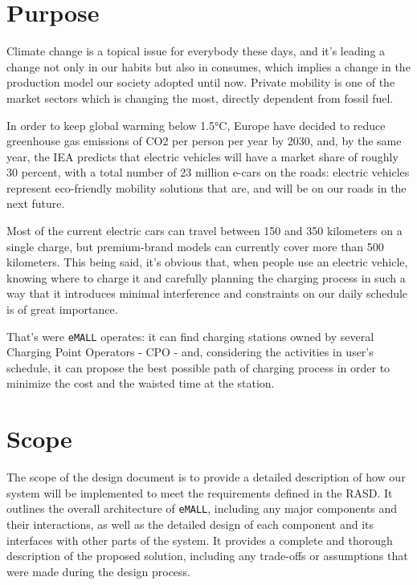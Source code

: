 \section{Purpose}
\label{sec:purpose}%
Climate change is a topical issue for everybody these days, and it's leading a change not only in our habits but also in consumes, which implies a change in the production model our society adopted until now.
Private mobility is one of the market sectors which is changing the most, directly dependent from fossil fuel.

In order to keep global warming below 1.5°C, Europe have decided to reduce greenhouse gas emissions of CO2 per
person per year by 2030, and, by the same year, the IEA predicts that electric vehicles will have a market share of roughly 30 percent, with a total number of 23 million e-cars on the roads: electric vehicles represent eco-friendly mobility solutions that are, and will be on our roads in the next future.

Most of the current electric cars can travel between 150 and 350 kilometers on a single charge, but premium-brand models can currently cover more than 500 kilometers.
This being said, it's obvious that, when people use an electric vehicle, knowing where to charge it and carefully planning the
charging process in such a way that it introduces minimal interference and constraints on our daily schedule
is of great importance.

That's were \verb|eMALL| operates: it can find charging stations owned by several Charging Point Operators - CPO - and,
considering the activities in user's schedule, it can propose the best possible path of charging process
in order to minimize the cost and the waisted time at the station.


\section{Scope}
\label{sec:scope}%
The scope of the design document is to provide a detailed description of how our system will be implemented to meet the requirements defined in the RASD\@.
It outlines the overall architecture of \verb|eMALL|, including any major components and their interactions, as well as the detailed design of each component and its interfaces with other parts of the system.
It provides a complete and thorough description of the proposed solution, including any trade-offs or assumptions that were made during the design process.


